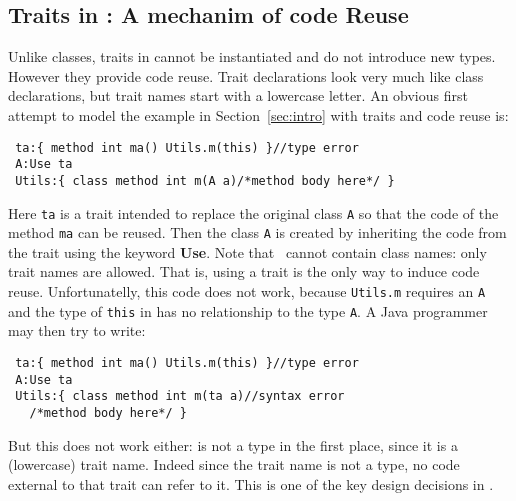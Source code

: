 \subsection{Traits in \name: A mechanim of code Reuse}

Unlike classes, traits in \name cannot be instantiated and do not introduce new
types. However they provide code reuse.
Trait declarations 
look very much like class declarations, but trait names 
start with a lowercase letter. An obvious first attempt 
to model the example in Section~\ref{sec:intro} 
with traits and code reuse is:
\saveSpace
\begin{lstlisting}
 ta:{ method int ma() Utils.m(this) }//type error
 A:Use ta
 Utils:{ class method int m(A a)/*method body here*/ }
\end{lstlisting}
\saveSpace
\noindent Here \lstinline{ta} is a trait intended to replace the
original class \lstinline{A} so that the code of the method
\lstinline{ma} can be reused. Then the class \lstinline{A} 
is created by inheriting the code from the trait using the keyword 
{\bf Use}. Note that \use\ cannot contain class names: only trait
names are allowed.
That is, using a trait is the only way to induce code reuse.
Unfortunatelly, this code does not work, 
because \lstinline{Utils.m} requires an \lstinline{A} and the type of \lstinline{this} in
\Q@ta@ has no relationship to the type \lstinline{A}.
A Java programmer may then try to write:
\saveSpace
\begin{lstlisting}
 ta:{ method int ma() Utils.m(this) }//type error
 A:Use ta
 Utils:{ class method int m(ta a)//syntax error
   /*method body here*/ }
\end{lstlisting}
\saveSpace
But this does not work either: \Q@ta@ is not a type in the first place, since it is a (lowercase) trait name.
Indeed
since the trait name is not a type, no code external to that trait can
refer to it. This is one of the key design decisions in \name. 




